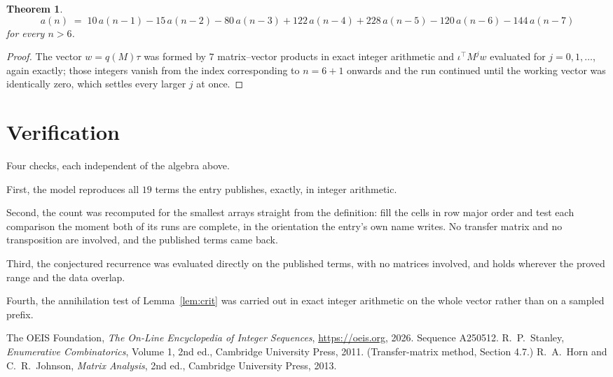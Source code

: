 \documentclass[11pt,a4paper]{article}
\theoremstyle{plain}
\newtheorem{theorem}{Theorem}
\theoremstyle{definition}
\begin{document}
\begin{theorem}
\[
a(n)\;=\;10\,a(n-1) - 15\,a(n-2) - 80\,a(n-3) + 122\,a(n-4) + 228\,a(n-5) - 120\,a(n-6) - 144\,a(n-7)
\]
for every $n>6$.
\end{theorem}

\begin{proof}
The vector $w=q(M)\tau$ was formed by $7$ matrix--vector products in exact integer
arithmetic and $\iota^{\!\top}M^{j}w$ evaluated for $j=0,1,\dots$, again exactly; those
integers vanish from the index corresponding to $n=6+1$ onwards and the run continued
until the working vector was identically zero, which settles every larger $j$ at once.
\end{proof}

\section{Verification}

Four checks, each independent of the algebra above.

First, the model reproduces all $19$ terms the entry publishes, exactly, in integer
arithmetic.

Second, the count was recomputed for the smallest arrays straight from the definition: fill the
cells in row major order and test each comparison the moment both of its runs are complete,
in the orientation the entry's own name writes. No transfer matrix and no transposition are
involved, and the published terms came back.

Third, the conjectured recurrence was evaluated directly on the published terms, with no
matrices involved, and holds wherever the proved range and the data overlap.

Fourth, the annihilation test of Lemma~\ref{lem:crit} was carried out in exact integer
arithmetic on the whole vector rather than on a sampled prefix.

\begin{thebibliography}{9}
 The OEIS Foundation, \emph{The On-Line Encyclopedia of Integer
Sequences}, \url{https://oeis.org}, 2026. Sequence A250512.
 R.~P.~Stanley, \emph{Enumerative Combinatorics}, Volume 1, 2nd ed.,
Cambridge University Press, 2011. (Transfer-matrix method, Section 4.7.)
 R.~A.~Horn and C.~R.~Johnson, \emph{Matrix Analysis}, 2nd ed., Cambridge
University Press, 2013.
\end{thebibliography}
\end{document}
